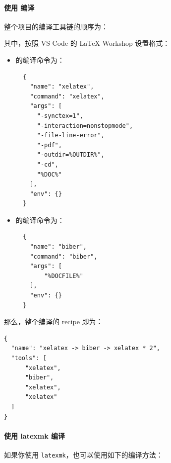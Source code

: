 \paragraph{使用 {} 编译}
整个项目的编译工具链的顺序为：
\begin{center}
\end{center}


其中，按照 VS Code 的 LaTeX Workshop 设置格式：

\begin{itemize}
  \item {} 的编译命令为：
  \begin{verbatim}
  {
    "name": "xelatex",
    "command": "xelatex",
    "args": [
      "-synctex=1",
      "-interaction=nonstopmode",
      "-file-line-error",
      "-pdf",
      "-outdir=%OUTDIR%",
      "-cd",
      "%DOC%"
    ],
    "env": {}
  }
  \end{verbatim}
  \item {} 的编译命令为：
  \begin{verbatim}
  {
    "name": "biber",
    "command": "biber",
    "args": [
        "%DOCFILE%"
    ],
    "env": {}
  }
  \end{verbatim}
\end{itemize}

那么，整个编译的 recipe 即为：

\begin{verbatim}
{
  "name": "xelatex -> biber -> xelatex * 2",
  "tools": [
      "xelatex",
      "biber",
      "xelatex",
      "xelatex"
  ]
}
\end{verbatim}

\paragraph{使用 latexmk 编译}
如果你使用 \texttt{latexmk}，也可以使用如下的编译方法：


